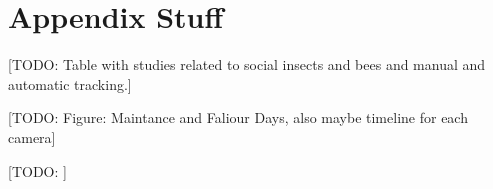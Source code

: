 \chapter{Appendix Stuff}
\label{ch:appendix}



[TODO: Table with studies related to social insects and bees and manual and automatic tracking.]

[TODO: Figure: Maintance and Faliour Days, also maybe timeline for each camera]

[TODO: ]